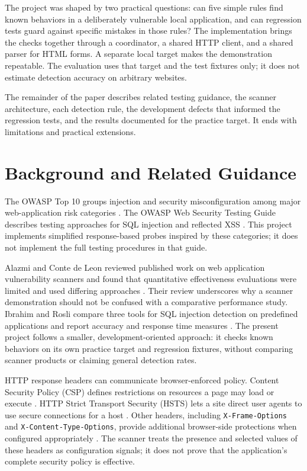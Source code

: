 \documentclass[conference]{IEEEtran}
\begin{document}
The project was shaped by two practical questions: can five simple rules find
known behaviors in a deliberately vulnerable local application, and can
regression tests guard against specific mistakes in those rules? The
implementation brings the checks together through a coordinator, a shared
HTTP client, and a shared parser for HTML forms. A separate local target makes
the demonstration repeatable. The evaluation uses that target and the test
fixtures only; it does not estimate detection accuracy on arbitrary websites.

The remainder of the paper describes related testing guidance, the scanner
architecture, each detection rule, the development defects that informed the
regression tests, and the results documented for the practice target. It ends
with limitations and practical extensions.

\section{Background and Related Guidance}
The OWASP Top 10 groups injection and security misconfiguration among major
web-application risk categories \cite{owaspTop10}. The OWASP Web Security
Testing Guide describes testing approaches for SQL injection and reflected XSS
\cite{wstgSQLi,wstgXSS}. This project implements simplified response-based
probes inspired by these categories; it does not implement the full testing
procedures in that guide.

Alazmi and Conte de Leon reviewed published work on web application
vulnerability scanners and found that quantitative effectiveness evaluations
were limited and used differing approaches \cite{alazmi}. Their review
underscores why a scanner demonstration should not be confused with a
comparative performance study. Ibrahim and Rosli compare three tools for SQL
injection detection on predefined applications and report accuracy and response
time measures \cite{ibrahim}. The present project follows a smaller,
development-oriented approach: it checks known behaviors on its own practice
target and regression fixtures, without comparing scanner products or claiming
general detection rates.

HTTP response headers can communicate browser-enforced policy. Content Security
Policy (CSP) defines restrictions on resources a page may load or execute
\cite{csp3}. HTTP Strict Transport Security (HSTS) lets a site direct user
agents to use secure connections for a host \cite{rfc6797}. Other headers,
including \texttt{X-Frame-Options} and
\texttt{X-Content-Type-Options}, provide additional browser-side protections
when configured appropriately \cite{owaspHeaders}. The scanner treats the
presence and selected values of these headers as configuration signals; it
does not prove that the application's complete security policy is effective.
\end{document}

